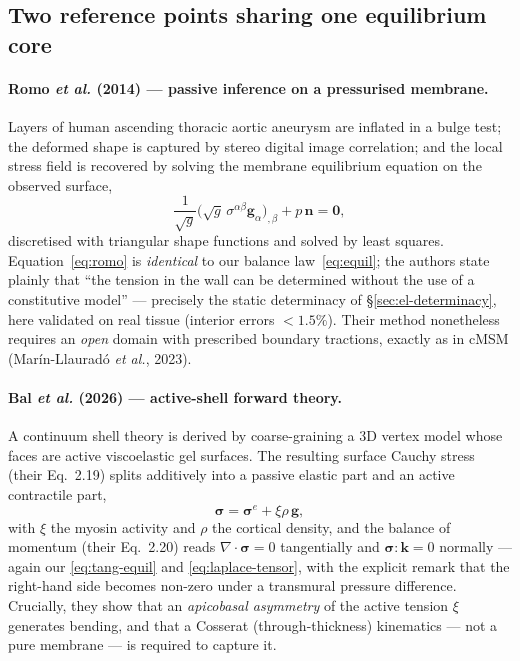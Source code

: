 \documentclass[11pt]{article}
\newcommand{\vv}[1]{\bm{#1}}          %
\newcommand{\nn}{\vv{n}}               %
\begin{document}
\subsection{Two reference points sharing one equilibrium core}
\label{sec:nt-anchors}

\paragraph{Romo \textit{et al.} (2014) --- passive inference on a pressurised
membrane.}  Layers of human ascending thoracic aortic aneurysm are inflated in a
bulge test; the deformed shape is captured by stereo digital image correlation;
and the local stress field is recovered by solving the membrane equilibrium
equation on the observed surface,
\begin{equation}
  \frac{1}{\sqrt g}\bigl(\sqrt g\,\sigma^{\alpha\beta}\vv g_\alpha\bigr)_{,\beta}
  + p\,\nn = \vv 0,
  \label{eq:romo}
\end{equation}
discretised with triangular shape functions and solved by least squares.
Equation~\eqref{eq:romo} is \emph{identical} to our balance
law~\eqref{eq:equil}; the authors state plainly that ``the tension in the wall
can be determined without the use of a constitutive model'' --- precisely the
static determinacy of \S\ref{sec:el-determinacy}, here validated on real tissue
(interior errors $<1.5\%$).  Their method nonetheless requires an \emph{open}
domain with prescribed boundary tractions, exactly as in cMSM
(Mar\'in-Llaurad\'o \textit{et al.}, 2023).

\paragraph{Bal \textit{et al.} (2026) --- active-shell forward theory.}  A
continuum shell theory is derived by coarse-graining a 3D vertex model whose
faces are active viscoelastic gel surfaces.  The resulting surface Cauchy stress
(their Eq.~2.19) splits additively into a passive elastic part and an active
contractile part,
\begin{equation}
  \boldsymbol\sigma = \boldsymbol\sigma^{e} + \xi\rho\,\vv g,
  \label{eq:bal-stress}
\end{equation}
with $\xi$ the myosin activity and $\rho$ the cortical density, and the balance
of momentum (their Eq.~2.20) reads $\nabla\!\cdot\boldsymbol\sigma=0$ tangentially
and $\boldsymbol\sigma\!:\!\vv k=0$ normally --- again our
\eqref{eq:tang-equil} and \eqref{eq:laplace-tensor}, with the explicit remark
that the right-hand side becomes non-zero under a transmural pressure difference.
Crucially, they show that an \emph{apicobasal asymmetry} of the active tension
$\xi$ generates bending, and that a Cosserat (through-thickness) kinematics ---
not a pure membrane --- is required to capture it.
\end{document}
